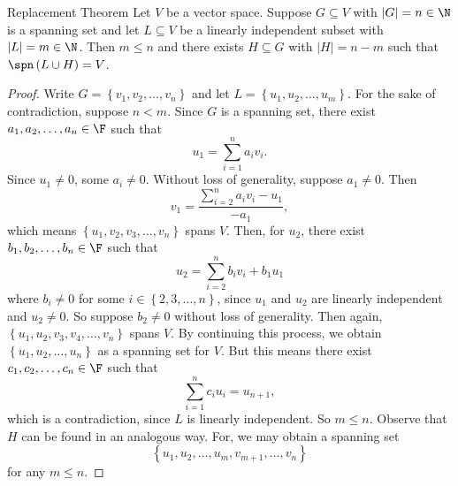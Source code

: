 \documentclass[linearalgebra]{subfiles}
\begin{document}
    \begin{theorem}{Replacement Theorem}
        Let $V$ be a vector space. Suppose $G\subseteq V$ with $\left| G \right| = n\in\N$ is a spanning set and let $L\subseteq V$ be a linearly independent subset with $\left| L \right| = m\in\N$. Then $m\leq n$ and there exists $H\subseteq G$ with $\left| H \right| = n-m$ such that $\spn\left( L\cup H \right) = V$.
    \end{theorem}

    \begin{proof}
        Write $G = \left\lbrace v_1,v_2,\ldots,v_n \right\rbrace$ and let $L = \left\lbrace u_1,u_2,\ldots,u_m \right\rbrace$. For the sake of contradiction, suppose $n<m$. Since $G$ is a spanning set, there exist $a_1,a_2,\ldots,a_n\in\F$ such that
        \begin{equation*}
            u_1 = \sum^{n}_{i=1} a_iv_i.
        \end{equation*}
        Since $u_1\neq 0$, some $a_i\neq 0$. Without loss of generality, suppose $a_1\neq 0$. Then
        \begin{equation*}
            v_1 = \frac{\sum^{n}_{i=2} a_iv_i-u_1}{-a_1},
        \end{equation*}
        which means $\left\lbrace u_1,v_2,v_3,\ldots,v_n \right\rbrace$ spans $V$. Then, for $u_2$, there exist $b_1,b_2,\ldots,b_n\in\F$ such that
        \begin{equation*}
            u_2 = \sum^{n}_{i=2} b_iv_i + b_1u_1
        \end{equation*}
        where $b_i\neq 0$ for some $i\in\left\lbrace 2,3,\ldots,n \right\rbrace$, since $u_1$ and $u_2$ are linearly independent and $u_2\neq 0$. So suppose $b_2\neq 0$ without loss of generality. Then again, $\left\lbrace u_1,u_2,v_3,v_4,\ldots,v_n \right\rbrace$ spans $V$. By continuing this process, we obtain $\left\lbrace u_1,u_2,\ldots,u_n \right\rbrace$ as a spanning set for $V$. But this means there exist $c_1,c_2,\ldots,c_n\in\F$ such that
        \begin{equation*}
            \sum^{n}_{i=1} c_iu_i = u_{n+1},
        \end{equation*}
        which is a contradiction, since $L$ is linearly independent. So $m\leq n$. Observe that $H$ can be found in an analogous way. For, we may obtain a spanning set
        \begin{equation*}
            \left\lbrace u_1,u_2,\ldots,u_m,v_{m+1}, \ldots,v_n \right\rbrace 
        \end{equation*}
        for any $m\leq n$.
    \end{proof}
\end{document}

